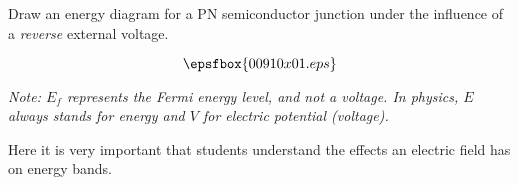  

Draw an energy diagram for a PN semiconductor junction under the influence of a {\it reverse} external voltage.







$$\epsfbox{00910x01.eps}$$

{\it Note: $E_f$ represents the Fermi energy level, and not a voltage.  In physics, $E$ always stands for energy and $V$ for electric potential (voltage).} 







Here it is very important that students understand the effects an electric field has on energy bands.




